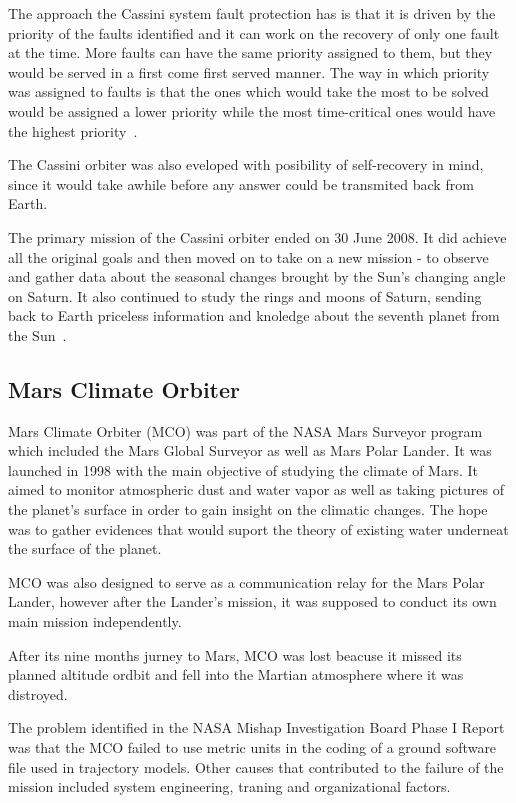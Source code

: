 The approach the Cassini system fault protection has is that it is driven by the
priority of the faults identified and it can work on the recovery of only one
fault at the time. More faults can have the same priority assigned to them, but
they would be served in a first come first served manner. The way in which
priority was assigned to faults is that the ones which would take the most to be
solved would be assigned a lower priority while the most time-critical ones
would have the highest priority~\cite{ft-space-avionics}.

The Cassini orbiter was also eveloped with posibility of self-recovery in mind,
since it would take awhile before any answer could be transmited back from
Earth.

The primary mission of the Cassini orbiter ended on 30 June 2008. It did achieve
all the original goals and then moved on to take on a new mission - to observe
and gather data about the seasonal changes brought by the Sun's changing angle
on Saturn. It also continued to study the rings and moons of Saturn, sending
back to Earth priceless information and knoledge about the seventh planet from
the Sun~\cite{ch-nasa}.

\subsection{Mars Climate Orbiter}
Mars Climate Orbiter (MCO)\cite{mco-nasa} was part of the NASA Mars Surveyor
program which included the Mars Global Surveyor as well as Mars Polar Lander. It
was launched in 1998 with the main objective of studying the climate of Mars. It
aimed to monitor atmospheric dust and water vapor as well as taking pictures of
the planet's surface in order to gain insight on the climatic changes. The hope
was to gather evidences that would suport the theory of existing water underneat
the surface of the planet.

MCO was also designed to serve as a communication relay for the Mars Polar
Lander, however after the Lander's mission, it was supposed to conduct its own
main mission independently.

After its nine months jurney to Mars, MCO was lost beacuse it missed its planned
altitude ordbit and fell into the Martian atmosphere where it was distroyed.

The problem identified in the NASA Mishap Investigation Board Phase I
Report~\cite{mco-rep} was that the MCO failed to use metric units in the coding
of a ground software file used in trajectory models. Other causes that
contributed to the failure of the mission included system engineering, traning
and organizational factors.


